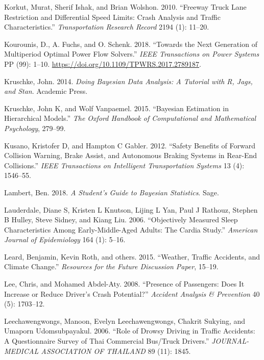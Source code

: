 \documentclass[12pt]{book}
\numberwithin{equation}{chapter}
\begin{document}
\leavevmode\hypertarget{ref-korkut2010freeway}{}%
Korkut, Murat, Sherif Ishak, and Brian Wolshon. 2010. ``Freeway Truck Lane Restriction and Differential Speed Limits: Crash Analysis and Traffic Characteristics.'' \emph{Transportation Research Record} 2194 (1): 11--20.

\leavevmode\hypertarget{ref-Kourounis2018}{}%
Kourounis, D., A. Fuchs, and O. Schenk. 2018. ``Towards the Next Generation of Multiperiod Optimal Power Flow Solvers.'' \emph{IEEE Transactions on Power Systems} PP (99): 1--10. \url{https://doi.org/10.1109/TPWRS.2017.2789187}.

\leavevmode\hypertarget{ref-kruschke2014doing}{}%
Kruschke, John. 2014. \emph{Doing Bayesian Data Analysis: A Tutorial with R, Jags, and Stan}. Academic Press.

\leavevmode\hypertarget{ref-kruschke2015bayesian}{}%
Kruschke, John K, and Wolf Vanpaemel. 2015. ``Bayesian Estimation in Hierarchical Models.'' \emph{The Oxford Handbook of Computational and Mathematical Psychology}, 279--99.

\leavevmode\hypertarget{ref-kusano2012safety}{}%
Kusano, Kristofer D, and Hampton C Gabler. 2012. ``Safety Benefits of Forward Collision Warning, Brake Assist, and Autonomous Braking Systems in Rear-End Collisions.'' \emph{IEEE Transactions on Intelligent Transportation Systems} 13 (4): 1546--55.

\leavevmode\hypertarget{ref-lambert2018student}{}%
Lambert, Ben. 2018. \emph{A Student's Guide to Bayesian Statistics}. Sage.

\leavevmode\hypertarget{ref-lauderdale2006objectively}{}%
Lauderdale, Diane S, Kristen L Knutson, Lijing L Yan, Paul J Rathouz, Stephen B Hulley, Steve Sidney, and Kiang Liu. 2006. ``Objectively Measured Sleep Characteristics Among Early-Middle-Aged Adults: The Cardia Study.'' \emph{American Journal of Epidemiology} 164 (1): 5--16.

\leavevmode\hypertarget{ref-leard2015weather}{}%
Leard, Benjamin, Kevin Roth, and others. 2015. ``Weather, Traffic Accidents, and Climate Change.'' \emph{Resources for the Future Discussion Paper}, 15--19.

\leavevmode\hypertarget{ref-lee2008presence}{}%
Lee, Chris, and Mohamed Abdel-Aty. 2008. ``Presence of Passengers: Does It Increase or Reduce Driver's Crash Potential?'' \emph{Accident Analysis \& Prevention} 40 (5): 1703--12.

\leavevmode\hypertarget{ref-leechawengwongs2006role}{}%
Leechawengwongs, Manoon, Evelyn Leechawengwongs, Chakrit Sukying, and Umaporn Udomsubpayakul. 2006. ``Role of Drowsy Driving in Traffic Accidents: A Questionnaire Survey of Thai Commercial Bus/Truck Drivers.'' \emph{JOURNAL-MEDICAL ASSOCIATION OF THAILAND} 89 (11): 1845.
\end{document}
